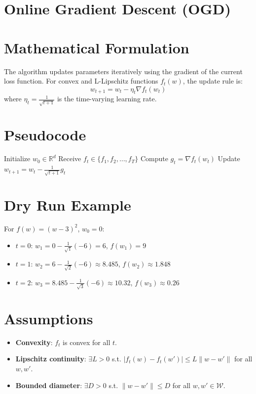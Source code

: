 \documentclass{article}
\begin{document}
\section*{Online Gradient Descent (OGD)}
\section*{Mathematical Formulation}
The algorithm updates parameters iteratively using the gradient of the current loss function. For convex and L-Lipschitz functions \( f_t(w) \), the update rule is:
\[ w_{t+1} = w_t - \eta_t \nabla f_t(w_t) \]
where \( \eta_t = \frac{1}{\sqrt{t+1}} \) is the time-varying learning rate.

\section*{Pseudocode}
\begin{algorithm}[H]
  \caption{Online Gradient Descent (OGD)}
  \begin{algorithmic}[1]
    \State Initialize \( w_0 \in \mathbb{R}^d \)
      \State Receive \( f_t \in \{ f_1, f_2, \ldots, f_T \} \)
      \State Compute \( g_t = \nabla f_t(w_t) \)
      \State Update \( w_{t+1} = w_t - \frac{1}{\sqrt{t+1}} g_t \)
    \EndFor
  \end{algorithmic}
\end{algorithm}

\section*{Dry Run Example}
For \( f(w) = (w-3)^2 \), \( w_0 = 0 \):
\begin{itemize}
  \item \( t=0 \): \( w_1 = 0 - \frac{1}{\sqrt{1}}(-6) = 6 \), \( f(w_1) = 9 \)
  \item \( t=1 \): \( w_2 = 6 - \frac{1}{\sqrt{2}}(-6) \approx 8.485 \), \( f(w_2) \approx 1.848 \)
  \item \( t=2 \): \( w_3 = 8.485 - \frac{1}{\sqrt{3}}(-6) \approx 10.32 \), \( f(w_3) \approx 0.26 \)
\end{itemize}

\section*{Assumptions}
\begin{itemize}
  \item \textbf{Convexity}: \( f_t \) is convex for all \( t \).
  \item \textbf{Lipschitz continuity}: \( \exists L > 0 \) s.t. \( |f_t(w) - f_t(w')| \leq L\|w - w'\| \) for all \( w, w' \).
  \item \textbf{Bounded diameter}: \( \exists D > 0 \) s.t. \( \| w - w' \| \leq D \) for all \( w, w' \in \mathcal{W} \).
\end{itemize}
\end{document}
